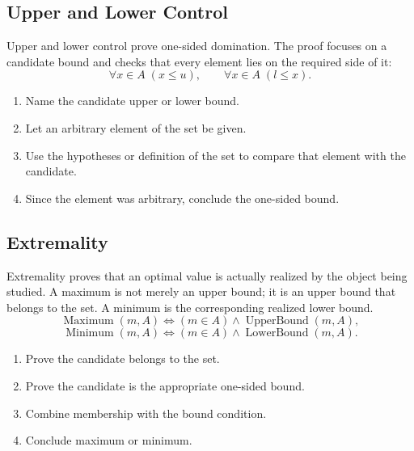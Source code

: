 \subsection*{Upper and Lower Control}
\label{subsec:property-upper-lower-control}

Upper and lower control prove one-sided domination. The proof focuses on a
candidate bound and checks that every element lies on the required side of it:
\[
  \forall x\in A\;(x\leq u),
  \qquad
  \forall x\in A\;(l\leq x).
\]

\begin{remark}
\begin{enumerate}
  \item Name the candidate upper or lower bound.
  \item Let an arbitrary element of the set be given.
  \item Use the hypotheses or definition of the set to compare that element
        with the candidate.
  \item Since the element was arbitrary, conclude the one-sided bound.
\end{enumerate}
\end{remark}

\subsection*{Extremality}
\label{subsec:property-extremality}

Extremality proves that an optimal value is actually realized by the object
being studied. A maximum is not merely an upper bound; it is an upper bound
that belongs to the set. A minimum is the corresponding realized lower bound.
\[
  \operatorname{Maximum}(m,A)
  \Longleftrightarrow
  (m\in A)\land \operatorname{UpperBound}(m,A),
\]
\[
  \operatorname{Minimum}(m,A)
  \Longleftrightarrow
  (m\in A)\land \operatorname{LowerBound}(m,A).
\]

\begin{remark}
\begin{enumerate}
  \item Prove the candidate belongs to the set.
  \item Prove the candidate is the appropriate one-sided bound.
  \item Combine membership with the bound condition.
  \item Conclude maximum or minimum.
\end{enumerate}
\end{remark}

